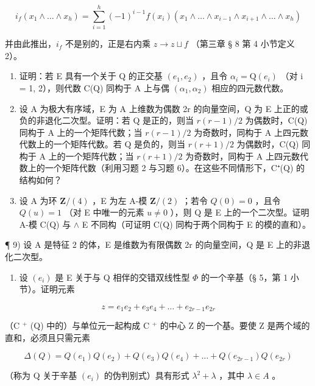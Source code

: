 \[
i _ {f} \left(x _ {1} \wedge \dots \wedge x _ {h}\right) = \sum_ {i = 1} ^ {h} (- 1) ^ {i - 1} f \left(x _ {i}\right) \left(x _ {1} \wedge \dots \wedge x _ {i - 1} \wedge x _ {i + 1} \wedge \dots \wedge x _ {h}\right)
\]

并由此推出，\(i_{f}\) 不是别的，正是右内乘 \(z \to z \sqcup f\) （第三章 § 8 第 4 小节定义 2）。

\begin{enumerate}
\def\labelenumi{\arabic{enumi})}
\setcounter{enumi}{5}
\item
  证明：若 E 具有一个关于 Q 的正交基 \((e_{1}, e_{2})\) ，且令 \(\alpha_{i} = \mathrm{Q}(e_{i})\) （对 i = 1, 2），则代数 C(Q) 同构于 A 上与偶 \((\alpha_{1}, \alpha_{2})\) 相应的四元数代数。
\item
  设 A 为极大有序域，E 为 A 上维数为偶数 2r 的向量空间，Q 为 E 上正的或负的非退化二次型。证明：若 Q 是正的，则当 \(r(r-1)/2\) 为偶数时，C(Q) 同构于 A 上的一个矩阵代数；当 \(r(r-1)/2\) 为奇数时，同构于 A 上四元数代数上的一个矩阵代数。若 Q 是负的，则当 \(r(r+1)/2\) 为偶数时，C(Q) 同构于 A 上的一个矩阵代数；当 \(r(r+1)/2\) 为奇数时，同构于 A 上四元数代数上的一个矩阵代数（利用习题 2 与习题 6）。在这些不同情形下，C⁺(Q) 的结构如何？
\item
  设 A 为环 \(\mathbf{Z}/(4)\) ，E 为左 A-模 \(\mathbf{Z}/(2)\) ；若令 \(Q(0)=0\) ，且令 \(Q(u)=1\) （对 E 中唯一的元素 \(u\neq0\) ），则 Q 是 E 上的一个二次型。证明 A-模 C(Q) 与 \(\wedge\) E 不同构（可证明 C(Q) 同构于两个同构于 E 的模的直和）。
\end{enumerate}

¶ 9) 设 A 是特征 2 的体，E 是维数为有限偶数 2r 的向量空间，Q 是 E 上的非退化二次型。

\begin{enumerate}
\def\labelenumi{\alph{enumi})}
\tightlist
\item
  设 \((e_i)\) 是 E 关于与 Q 相伴的交错双线性型 \(\Phi\) 的一个辛基（§ 5，第 1 小节）。证明元素
\end{enumerate}

\[
z = e _ {1} e _ {2} + e _ {3} e _ {4} + \dots + e _ {2 r - 1} e _ {2 r}
\]

（C \(^{+}\) (Q) 中的）与单位元一起构成 C \(^{+}\) 的中心 Z 的一个基。要使 Z 是两个域的直和，必须且只需元素

\[
\Delta (Q) = Q \left(e _ {1}\right) Q \left(e _ {2}\right) + Q \left(e _ {3}\right) Q \left(e _ {4}\right) + \dots + Q \left(e _ {2 r - 1}\right) Q \left(e _ {2 r}\right)
\]

（称为 Q 关于辛基 \((e_{i})\) 的伪判别式）具有形式 \(\lambda^{2} + \lambda\) ，其中 \(\lambda \in A\) 。

